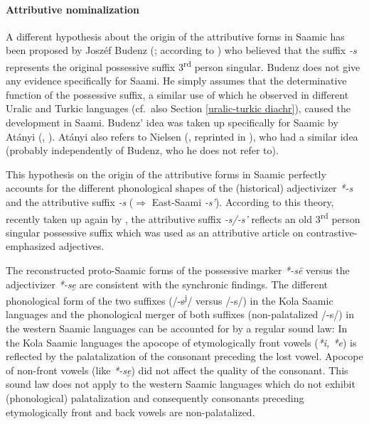 {\paragraph{Attributive nominalization} A different hypothesis about the origin of the attributive forms in Saamic has been proposed by Joszéf Budenz (\citeyear{budenz1870}; according to \citealt{atanyi1942,atanyi1943}) who believed that the suffix \textit{-s} represents the original possessive suffix 3\textsuperscript{rd} person singular. Budenz does not give any evidence specifically for Saami. He simply assumes that the determinative function of the possessive suffix, a similar use of which he observed in different Uralic and Turkic languages (cf.~also Section \ref{uralic-turkic diachr}), caused the development in Saami. Budenz' idea was taken up specifically for Saamic by Atányi (\citeyear{atanyi1942}, \citeyear{atanyi1943}). Atányi also refers to Nielsen (\citeyear{nielsen1933}, reprinted in \citealt{nielsen1945b}), who had a similar idea (probably independently of Budenz, who he does not refer to).

This hypothesis on the origin of the attributive forms in Saamic perfectly accounts for the different phonological shapes of the (historical) adjectivizer \mbox{\textit{*-s}} and the attributive suffix \textit{-s} ($\Rightarrow$ East-Saami \textit{-s'}). According to this theory, recently taken up again by \cite{riesler2006b}, the attributive suffix \textit{-s/-s'} reflects an old 3\textsuperscript{rd} person singular possessive suffix which was used as an attributive article on contrastive-emphasized adjectives.

The reconstructed proto-Saamic forms of the possessive marker \textit{*-sē} \cite[73]{sammallahti1998b} versus the adjectivizer \textit{*-se̮} are consistent with the synchronic findings. The different phonological form of the two suffixes (/-s\textsuperscript{j}/ versus /-s/) in the Kola Saamic languages and the phonological merger of both suffixes (non-palatalized /-s/) in the western Saamic languages can be accounted for by a regular sound law: In the Kola Saamic languages the apocope of etymologically front vowels (\textit{*i, *e}) is reflected by the palatalization of the consonant preceding the lost vowel. Apocope of non-front vowels (like \textit{*-se̮}) did not affect the quality of the consonant. This sound law does not apply to the western Saamic languages which do not exhibit (phonological) palatalization and consequently consonants preceding etymologically front and back vowels are non-palatalized.

}
